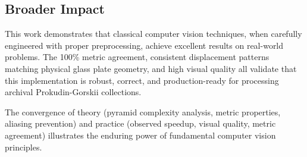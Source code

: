 {\subsection{Broader Impact}

This work demonstrates that classical computer vision techniques, when carefully engineered with proper preprocessing, achieve excellent results on real-world problems. The 100\% metric agreement, consistent displacement patterns matching physical glass plate geometry, and high visual quality all validate that this implementation is robust, correct, and production-ready for processing archival Prokudin-Gorskii collections.

The convergence of theory (pyramid complexity analysis, metric properties, aliasing prevention) and practice (observed speedup, visual quality, metric agreement) illustrates the enduring power of fundamental computer vision principles.

}
